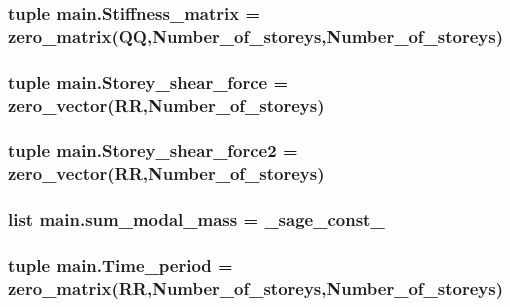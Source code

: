 \subsubsection[{Stiffness\+\_\+matrix}]{\setlength{\rightskip}{0pt plus 5cm}tuple main.\+Stiffness\+\_\+matrix = zero\+\_\+matrix(Q\+Q,Number\+\_\+of\+\_\+storeys,Number\+\_\+of\+\_\+storeys)}\label{namespacemain_a0011be18dbc87087d6aaf28802f121c0}
\hypertarget{namespacemain_aaa52e7055409dcf0785880422294a704}{}
\subsubsection[{Storey\+\_\+shear\+\_\+force}]{\setlength{\rightskip}{0pt plus 5cm}tuple main.\+Storey\+\_\+shear\+\_\+force = zero\+\_\+vector(R\+R,Number\+\_\+of\+\_\+storeys)}\label{namespacemain_aaa52e7055409dcf0785880422294a704}
\hypertarget{namespacemain_ad9f40bb3020e00eecaf17c078a1e61b6}{}
\subsubsection[{Storey\+\_\+shear\+\_\+force2}]{\setlength{\rightskip}{0pt plus 5cm}tuple main.\+Storey\+\_\+shear\+\_\+force2 = zero\+\_\+vector(R\+R,Number\+\_\+of\+\_\+storeys)}\label{namespacemain_ad9f40bb3020e00eecaf17c078a1e61b6}
\hypertarget{namespacemain_a27fb93072b84fd448623807df350f132}{}
\subsubsection[{sum\+\_\+modal\+\_\+mass}]{\setlength{\rightskip}{0pt plus 5cm}list main.\+sum\+\_\+modal\+\_\+mass = \+\_\+sage\+\_\+const\+\_}\label{namespacemain_a27fb93072b84fd448623807df350f132}
\hypertarget{namespacemain_a76fa8360c88818d30b9b5d2a473e79e4}{}
\subsubsection[{Time\+\_\+period}]{\setlength{\rightskip}{0pt plus 5cm}tuple main.\+Time\+\_\+period = zero\+\_\+matrix(R\+R,Number\+\_\+of\+\_\+storeys,Number\+\_\+of\+\_\+storeys)}\label{namespacemain_a76fa8360c88818d30b9b5d2a473e79e4}
\hypertarget{namespacemain_afe9c3a972582e300106b7dec57600887}{}
